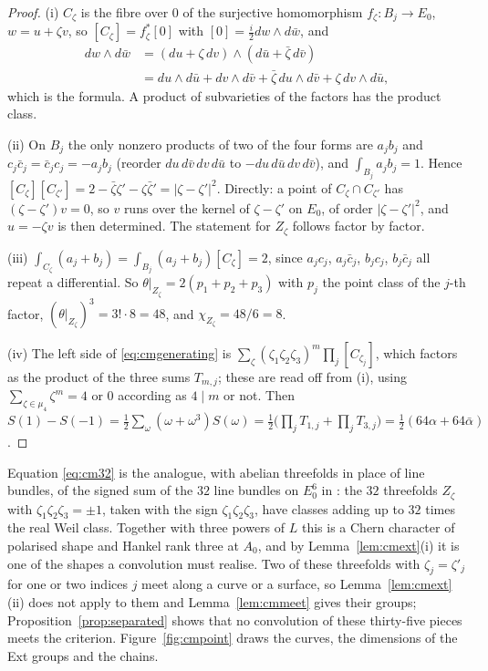 \documentclass[11pt,reqno]{amsart}
\numberwithin{equation}{section}
\theoremstyle{plain}
\theoremstyle{definition}
\begin{document}
\begin{proof}
(i) $C_{\zeta}$ is the fibre over $0$ of the surjective homomorphism $f_{\zeta}\colon B_{j}\to E_{0}$, $w=u+\zeta v$, so $[C_{\zeta}]=f_{\zeta}^{*}[0]$ with $[0]=\tfrac{i}{2}dw\wedge d\bar w$, and
\begin{align*}
dw\wedge d\bar w&=(du+\zeta\,dv)\wedge(d\bar u+\bar\zeta\,d\bar v)\\
&=du\wedge d\bar u+dv\wedge d\bar v+\bar\zeta\,du\wedge d\bar v+\zeta\,dv\wedge d\bar u ,
\end{align*}
which is the formula. A product of subvarieties of the factors has the product class.

(ii) On $B_{j}$ the only nonzero products of two of the four forms are $a_{j}b_{j}$ and $c_{j}\bar c_{j}=\bar c_{j}c_{j}=-a_{j}b_{j}$ (reorder $du\,d\bar v\,dv\,d\bar u$ to $-du\,d\bar u\,dv\,d\bar v$), and $\int_{B_{j}}a_{j}b_{j}=1$. Hence $[C_{\zeta}][C_{\zeta'}]=2-\bar\zeta\zeta'-\zeta\bar\zeta'=|\zeta-\zeta'|^{2}$. Directly: a point of $C_{\zeta}\cap C_{\zeta'}$ has $(\zeta-\zeta')v=0$, so $v$ runs over the kernel of $\zeta-\zeta'$ on $E_{0}$, of order $|\zeta-\zeta'|^{2}$, and $u=-\zeta v$ is then determined. The statement for $Z_{\zeta}$ follows factor by factor.

(iii) $\int_{C_{\zeta}}(a_{j}+b_{j})=\int_{B_{j}}(a_{j}+b_{j})[C_{\zeta}]=2$, since $a_{j}c_{j}$, $a_{j}\bar c_{j}$, $b_{j}c_{j}$, $b_{j}\bar c_{j}$ all repeat a differential. So $\theta|_{Z_{\zeta}}=2(p_{1}+p_{2}+p_{3})$ with $p_{j}$ the point class of the $j$-th factor, $(\theta|_{Z_{\zeta}})^{3}=3!\cdot8=48$, and $\chi_{Z_{\zeta}}=48/6=8$.

(iv) The left side of \eqref{eq:cmgenerating} is $\sum_{\zeta}(\zeta_{1}\zeta_{2}\zeta_{3})^{m}\prod_{j}[C_{\zeta_{j}}]$, which factors as the product of the three sums $T_{m,j}$; these are read off from (i), using $\sum_{\zeta\in\mu_{4}}\zeta^{m}=4$ or $0$ according as $4\mid m$ or not. Then $S(1)-S(-1)=\tfrac12\sum_{\omega}(\omega+\omega^{3})S(\omega)=\tfrac12\bigl(\prod_{j}T_{1,j}+\prod_{j}T_{3,j}\bigr)=\tfrac12(64\alpha+64\bar\alpha)$.
\end{proof}

Equation \eqref{eq:cm32} is the analogue, with abelian threefolds in place of line bundles, of the signed sum of the $32$ line bundles on $E_{0}^{6}$ in \cite[Prop.~18.21]{BMB26}: the $32$ threefolds $Z_{\zeta}$ with $\zeta_{1}\zeta_{2}\zeta_{3}=\pm1$, taken with the sign $\zeta_{1}\zeta_{2}\zeta_{3}$, have classes adding up to $32$ times the real Weil class. Together with three powers of $L$ this is a Chern character of polarised shape and Hankel rank three at $A_{0}$, and by Lemma~\ref{lem:cmext}(i) it is one of the shapes a convolution must realise. Two of these threefolds with $\zeta_{j}=\zeta'_{j}$ for one or two indices $j$ meet along a curve or a surface, so Lemma~\ref{lem:cmext}(ii) does not apply to them and Lemma~\ref{lem:cmmeet} gives their groups; Proposition~\ref{prop:separated} shows that no convolution of these thirty-five pieces meets the criterion. Figure~\ref{fig:cmpoint} draws the curves, the dimensions of the Ext groups and the chains.
\end{document}

